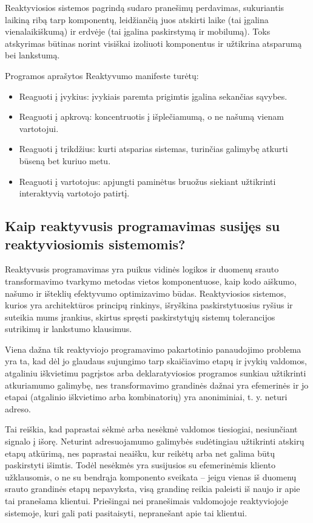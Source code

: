 Reaktyviosios sistemos pagrindą sudaro pranešimų perdavimas, sukuriantis laikiną ribą tarp komponentų, leidžiančią juos atskirti laike (tai įgalina vienalaikiškumą) ir erdvėje (tai įgalina paskirstymą ir mobilumą). Toks atskyrimas būtinas norint visiškai izoliuoti komponentus ir užtikrina atsparumą bei lankstumą.

Programos aprašytos Reaktyvumo manifeste turėtų:

\begin{itemize}
  \item Reaguoti į įvykius: įvykiais paremta prigimtis įgalina sekančias sąvybes.
  \item Reaguoti į apkrovą: koncentruotis į išplečiamumą, o ne našumą vienam vartotojui.
  \item Reaguoti į trikdžius: kurti atsparias sistemas, turinčias galimybę atkurti būseną bet kuriuo metu.
  \item Reaguoti į vartotojus: apjungti paminėtus bruožus siekiant užtikrinti interaktyvią vartotojo patirtį.
\end{itemize}

\subsection{Kaip reaktyvusis programavimas susijęs su reaktyviosiomis sistemomis?}

Reaktyvusis programavimas yra puikus vidinės logikos ir duomenų srauto transformavimo tvarkymo metodas vietos komponentuose, kaip kodo aiškumo, našumo ir išteklių efektyvumo optimizavimo būdas. Reaktyviosios sistemos, kurios yra architektūros principų rinkinys, išryškina paskirstytuosius ryšius ir suteikia mums įrankius, skirtus spręsti paskirstytųjų sistemų tolerancijos sutrikimų ir lankstumo klausimus.

Viena dažna tik reaktyviojo programavimo pakartotinio panaudojimo problema yra ta, kad dėl jo glaudaus sujungimo tarp skaičiavimo etapų ir įvykių valdomos, atgaliniu iškvietimu pagrįstos arba deklaratyviosios programos sunkiau užtikrinti atkuriamumo galimybę, nes transformavimo grandinės dažnai yra efemerinės ir jo etapai (atgalinio iškvietimo arba kombinatorių) yra anoniminiai, t. y. neturi adreso.

Tai reiškia, kad paprastai sėkmė arba nesėkmė valdomos tiesiogiai, nesiunčiant signalo į išorę. Neturint adresuojamumo galimybės sudėtingiau užtikrinti atskirų etapų atkūrimą, nes paprastai neaišku, kur reikėtų arba net galima būtų paskirstyti išimtis. Todėl nesėkmės yra susijusios su efemerinėmis kliento užklausomis, o ne su bendrąja komponento sveikata – jeigu vienas iš duomenų srauto grandinės etapų nepavyksta, visą grandinę reikia paleisti iš naujo ir apie tai pranešama klientui. Priešingai nei pranešimais valdomojoje reaktyviojoje sistemoje, kuri gali pati pasitaisyti, nepranešant apie tai klientui.

